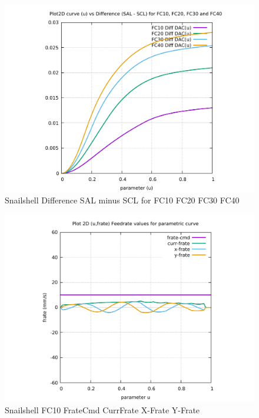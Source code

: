 \begin{figure}
	\caption     {Snailshell Difference SAL minus SCL for FC10 FC20 FC30 FC40}
	\label{26-img-Snailshell-Difference-SAL-minus-SCL-for-FC10-FC20-FC30-FC40.pdf}
	\includegraphics[width=1.00\textwidth]{Chap4/appendix/app-Snailshell/plots/26-img-Snailshell-Difference-SAL-minus-SCL-for-FC10-FC20-FC30-FC40.pdf}
\end{figure}


\clearpage
\pagebreak

\begin{figure}
	\caption     {Snailshell FC10 FrateCmd CurrFrate X-Frate Y-Frate}
	\label{27-img-Snailshell-FC10-FrateCmd-CurrFrate-X-Frate-Y-Frate.pdf}
	\includegraphics[width=1.00\textwidth]{Chap4/appendix/app-Snailshell/plots/27-img-Snailshell-FC10-FrateCmd-CurrFrate-X-Frate-Y-Frate.pdf}
\end{figure}


